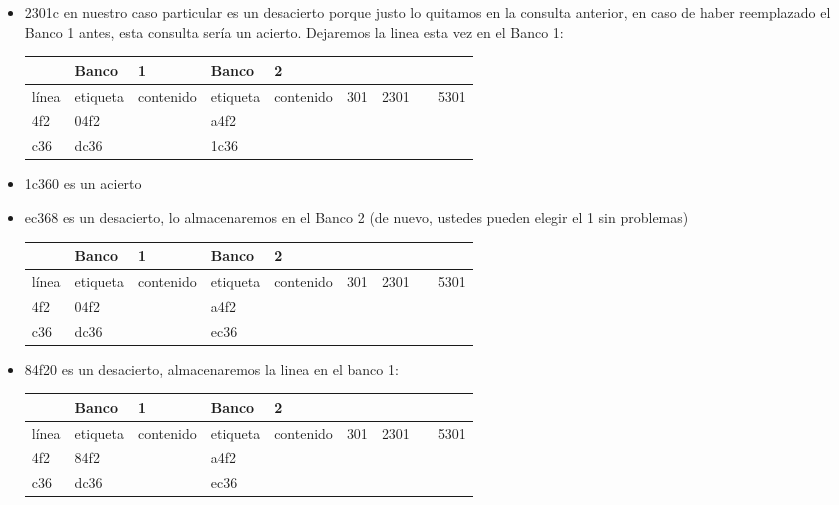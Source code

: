 \documentclass[dcc,sol]{fcfmcourse}
\begin{document}
\begin{problems}
\begin{solution}
\begin{enumerate}
\begin{itemize}
        \item 2301c en nuestro caso particular es un desacierto porque justo lo quitamos en la consulta anterior, en caso de haber reemplazado el Banco 1 antes, esta consulta sería un acierto. Dejaremos la linea esta vez en el Banco 1:

        \begin{table}[h]
        \centering
        \begin{tabular}{lllll}
        \hline
        & Banco & 1 & Banco & 2 \\ \hline
        línea & etiqueta & contenido & etiqueta & contenido &
        301 & 2301 & & 5301 & \\
        4f2 & 04f2 & & a4f2 & \\
        c36 & dc36 & & 1c36 & \\ \hline
        \end{tabular}
        \end{table}
        
        \item 1c360 es un acierto

        \newpage
        \item ec368 es un desacierto, lo almacenaremos en el Banco 2 (de nuevo, ustedes pueden elegir el 1 sin problemas)

        \begin{table}[h]
        \centering
        \begin{tabular}{lllll}
        \hline
        & Banco & 1 & Banco & 2 \\ \hline
        línea & etiqueta & contenido & etiqueta & contenido &
        301 & 2301 & & 5301 & \\
        4f2 & 04f2 & & a4f2 & \\
        c36 & dc36 & & ec36 & \\ \hline
        \end{tabular}
        \end{table}
        
        \item 84f20 es un desacierto, almacenaremos la linea en el banco 1:

        \begin{table}[h]
        \centering
        \begin{tabular}{lllll}
        \hline
        & Banco & 1 & Banco & 2 \\ \hline
        línea & etiqueta & contenido & etiqueta & contenido &
        301 & 2301 & & 5301 & \\
        4f2 & 84f2 & & a4f2 & \\
        c36 & dc36 & & ec36 & \\ \hline
        \end{tabular}
        \end{table}
        

\end{itemize}
\end{enumerate}
\end{solution}
\end{problems}
\end{document}
